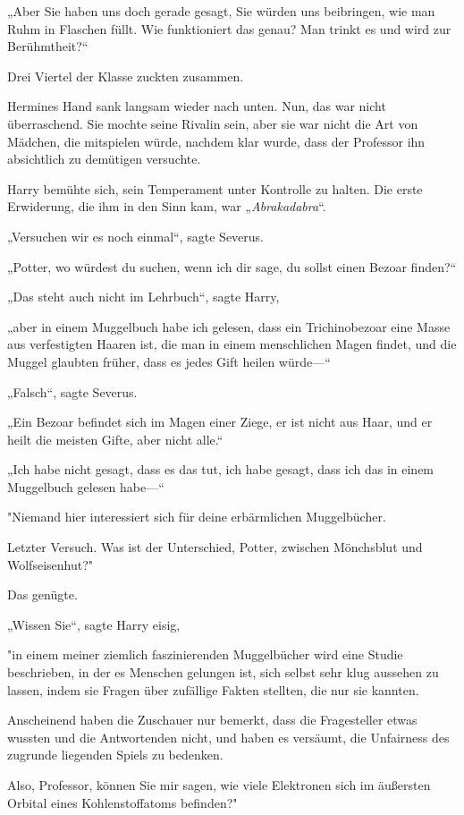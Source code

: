 {„Aber Sie haben uns doch gerade gesagt, Sie würden uns beibringen, wie man Ruhm in Flaschen füllt. Wie funktioniert das genau? Man trinkt es und wird zur Berühmtheit?“

Drei Viertel der Klasse zuckten zusammen.

Hermines Hand sank langsam wieder nach unten. Nun, das war nicht überraschend. Sie mochte seine Rivalin sein, aber sie war nicht die Art von Mädchen, die mitspielen würde, nachdem klar wurde, dass der Professor ihn absichtlich zu demütigen versuchte.

Harry bemühte sich, sein Temperament unter Kontrolle zu halten. Die erste Erwiderung, die ihm in den Sinn kam, war „\emph{Abrakadabra}“.

„Versuchen wir es noch einmal“, sagte Severus.

„Potter, wo würdest du suchen, wenn ich dir sage, du sollst einen Bezoar finden?“

„Das steht auch nicht im Lehrbuch“, sagte Harry,

„aber in einem Muggelbuch habe ich gelesen, dass ein Trichinobezoar eine Masse aus verfestigten Haaren ist, die man in einem menschlichen Magen findet, und die Muggel glaubten früher, dass es jedes Gift heilen würde—“

„Falsch“, sagte Severus.

„Ein Bezoar befindet sich im Magen einer Ziege, er ist nicht aus Haar, und er heilt die meisten Gifte, aber nicht alle.“

„Ich habe nicht gesagt, dass es das tut, ich habe gesagt, dass ich das in einem Muggelbuch gelesen habe—“

"Niemand hier interessiert sich für deine erbärmlichen Muggelbücher.

Letzter Versuch. Was ist der Unterschied, Potter, zwischen Mönchsblut und Wolfseisenhut?"

Das genügte.

„Wissen Sie“, sagte Harry eisig,

"in einem meiner ziemlich faszinierenden Muggelbücher wird eine Studie beschrieben, in der es Menschen gelungen ist, sich selbst sehr klug aussehen zu lassen, indem sie Fragen über zufällige Fakten stellten, die nur sie kannten.

Anscheinend haben die Zuschauer nur bemerkt, dass die Fragesteller etwas wussten und die Antwortenden nicht, und haben es versäumt, die Unfairness des zugrunde liegenden Spiels zu bedenken.

Also, Professor, können Sie mir sagen, wie viele Elektronen sich im äußersten Orbital eines Kohlenstoffatoms befinden?"

}
